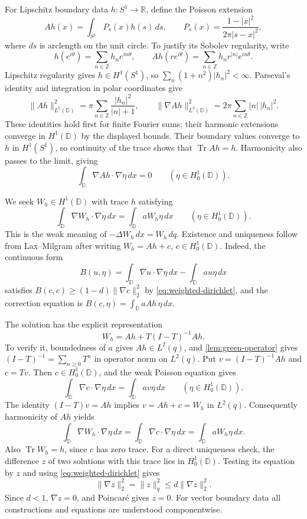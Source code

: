 For Lipschitz boundary data $h:S^1\to\mathbb R$, define the Poisson
extension
\begin{equation}\label{eq:poisson-extension}
 Ah(x)=\int_{S^1}P_s(x)h(s)\,ds,
 \qquad P_s(x)=\frac{1-|x|^2}{2\pi|s-x|^2},
\end{equation}
where $ds$ is arclength on the unit circle. To justify its Sobolev
regularity, write
\[
 h(e^{i\theta})=\sum_{n\in\mathbb Z}h_ne^{in\theta},
 \qquad
 Ah(re^{i\theta})=\sum_{n\in\mathbb Z}h_nr^{|n|}e^{in\theta}.
\]
Lipschitz regularity gives $h\in H^1(S^1)$, so
$\sum_n(1+n^2)|h_n|^2<\infty$. Parseval's identity and integration
in polar coordinates give
\[
 \|Ah\|_{L^2(\mathbb D)}^2
 =\pi\sum_{n\in\mathbb Z}\frac{|h_n|^2}{|n|+1},
 \qquad
 \|\nabla Ah\|_{L^2(\mathbb D)}^2
 =2\pi\sum_{n\in\mathbb Z}|n|\,|h_n|^2.
\]
These identities hold first for finite Fourier sums; their harmonic
extensions converge in $H^1(\mathbb D)$ by the displayed bounds.
Their boundary values converge to $h$ in $H^1(S^1)$, so continuity
of the trace shows that $\operatorname{Tr}Ah=h$. Harmonicity also
passes to the limit, giving
\[
 \int_{\mathbb D}\nabla Ah\cdot\nabla\eta\,dx=0
 \qquad(\eta\in H_0^1(\mathbb D)).
\]

We seek $W_h\in H^1(\mathbb D)$ with trace $h$ satisfying
\begin{equation}\label{eq:weak-potential-solution}
 \int_{\mathbb D}\nabla W_h\cdot\nabla\eta\,dx
 =\int_{\mathbb D}aW_h\eta\,dx
 \qquad(\eta\in H_0^1(\mathbb D)).
\end{equation}
This is the weak meaning of $-\Delta W_h\,dx=W_h\,dq$.
Existence and uniqueness follow from Lax--Milgram
\cite[Theorem 4.20, p.~103]{Hunter} after writing
$W_h=Ah+c$, $c\in H_0^1(\mathbb D)$. Indeed, the continuous form
\[
 B(u,\eta)=\int_{\mathbb D}\nabla u\cdot\nabla\eta\,dx
           -\int_{\mathbb D}au\eta\,dx
\]
satisfies
$B(c,c)\ge(1-d)\|\nabla c\|_2^2$ by
\cref{eq:weighted-dirichlet}, and the correction equation is
$B(c,\eta)=\int_{\mathbb D}aAh\,\eta\,dx$.

The solution has the explicit representation
\begin{equation}\label{eq:potential-extension}
 W_h=Ah+T(I-T)^{-1}Ah.
\end{equation}
To verify it, boundedness of $a$ gives $Ah\in L^2(q)$, and
\cref{lem:green-operator} gives
$(I-T)^{-1}=\sum_{n\ge0}T^n$ in operator norm on $L^2(q)$.
Put $v=(I-T)^{-1}Ah$ and $c=Tv$. Then
$c\in H_0^1(\mathbb D)$, and the weak Poisson equation gives
\[
 \int_{\mathbb D}\nabla c\cdot\nabla\eta\,dx
 =\int_{\mathbb D}av\eta\,dx
 \qquad(\eta\in H_0^1(\mathbb D)).
\]
The identity $(I-T)v=Ah$ implies $v=Ah+c=W_h$ in $L^2(q)$.
Consequently harmonicity of $Ah$ yields
\[
 \int_{\mathbb D}\nabla W_h\cdot\nabla\eta\,dx
 =\int_{\mathbb D}\nabla c\cdot\nabla\eta\,dx
 =\int_{\mathbb D}aW_h\eta\,dx.
\]
Also $\operatorname{Tr}W_h=h$, since $c$ has zero trace.
For a direct uniqueness check, the difference $z$ of two solutions
with this trace lies in $H_0^1(\mathbb D)$. Testing its equation by
$z$ and using \cref{eq:weighted-dirichlet} gives
\[
 \|\nabla z\|_2^2=\|z\|_q^2\le d\|\nabla z\|_2^2.
\]
Since $d<1$, $\nabla z=0$, and Poincar\'e gives $z=0$.
For vector boundary data all constructions and equations are
understood componentwise.

